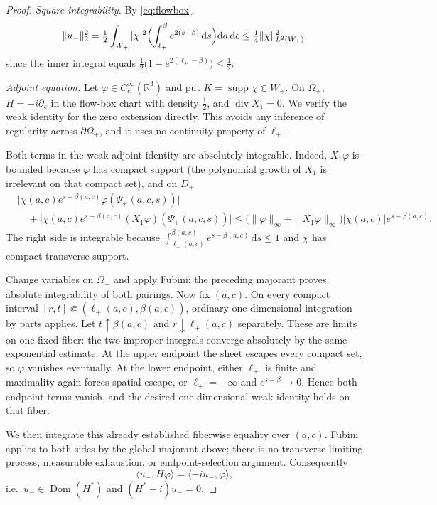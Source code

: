 ﻿\documentclass[11pt]{article}
\begin{document}
\begin{proof}
\textit{Square-integrability.} By \eqref{eq:flowbox},
\[
\|u_-\|_2^2
=\tfrac12\int_{W_+}|\chi|^2
\Bigl(\int_{\ell_+}^{\beta}e^{2(s-\beta)}\,\mathrm{d}s\Bigr)
\mathrm{d}a\,\mathrm{d}c
\le\tfrac14\|\chi\|_{L^2(W_+)}^2,
\]
since the inner integral equals \(\tfrac12\bigl(1-e^{2(\ell_+-\beta)}\bigr)\le\tfrac12\).

\textit{Adjoint equation.} Let \(\varphi\in C_c^\infty(\mathbb{R}^3)\) and
put \(K=\operatorname{supp}\chi\Subset W_+\). On \(\Omega_+\),
\(H=-i\partial_s\) in the flow-box chart with density \(\tfrac12\), and
\(\operatorname{div}X_1=0\). We verify the weak identity for the zero extension
directly. This avoids any inference of regularity across
\(\partial\Omega_+\), and it uses no continuity property of \(\ell_+\).

Both terms in the weak-adjoint identity are absolutely integrable. Indeed,
\(X_1\varphi\) is bounded because \(\varphi\) has compact support (the
polynomial growth of \(X_1\) is irrelevant on that compact set), and on
\(D_+\)
\[
\begin{split}
&\bigl|\chi(a,c)e^{s-\beta(a,c)}
  \varphi(\Psi_+(a,c,s))\bigr|\\
&\quad+
\bigl|\chi(a,c)e^{s-\beta(a,c)}
  (X_1\varphi)(\Psi_+(a,c,s))\bigr|
\le
\bigl(\|\varphi\|_\infty+\|X_1\varphi\|_\infty\bigr)
|\chi(a,c)|e^{s-\beta(a,c)} .
\end{split}
\]
The right side is integrable because
\(\int_{\ell_+(a,c)}^{\beta(a,c)}
e^{s-\beta(a,c)}\,\mathrm{d}s\le1\) and \(\chi\) has compact transverse
support.

Change variables on \(\Omega_+\) and apply Fubini; the preceding majorant
proves absolute integrability of both pairings. Now fix \((a,c)\). On every
compact interval
\([r,t]\Subset(\ell_+(a,c),\beta(a,c))\), ordinary one-dimensional
integration by parts applies. Let \(t\uparrow\beta(a,c)\) and
\(r\downarrow\ell_+(a,c)\) separately. These are limits on one fixed fiber:
the two improper integrals converge absolutely by the same exponential
estimate. At the upper endpoint the sheet escapes every compact set, so
\(\varphi\) vanishes eventually. At the lower endpoint, either \(\ell_+\) is
finite and maximality again forces spatial escape, or \(\ell_+=-\infty\) and
\(e^{s-\beta}\to0\). Hence both endpoint terms vanish, and the desired
one-dimensional weak identity holds on that fiber.

We then integrate this already established fiberwise equality over \((a,c)\).
Fubini applies to both sides by the global majorant above; there is no
transverse limiting process, measurable exhaustion, or endpoint-selection
argument. Consequently
\[
\langle u_-,H\varphi\rangle=\langle -iu_-,\varphi\rangle,
\]
i.e.\ \(u_-\in\operatorname{Dom}(H^*)\) and \((H^*+i)u_-=0\).


\end{proof}
\end{document}
